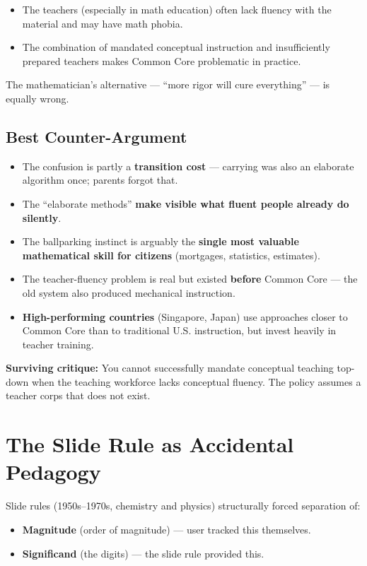 \documentclass[11pt]{article}
\begin{document}
\begin{itemize}
  \item The teachers (especially in math education) often lack fluency with the material and may have math phobia.
  \item The combination of mandated conceptual instruction and insufficiently prepared teachers makes Common Core problematic in practice.
\end{itemize}

The mathematician's alternative --- ``more rigor will cure everything'' --- is equally wrong.

\subsection{Best Counter-Argument}

\begin{itemize}
  \item The confusion is partly a \textbf{transition cost} --- carrying was also an elaborate algorithm once; parents forgot that.
  \item The ``elaborate methods'' \textbf{make visible what fluent people already do silently}.
  \item The ballparking instinct is arguably the \textbf{single most valuable mathematical skill for citizens} (mortgages, statistics, estimates).
  \item The teacher-fluency problem is real but existed \textbf{before} Common Core --- the old system also produced mechanical instruction.
  \item \textbf{High-performing countries} (Singapore, Japan) use approaches closer to Common Core than to traditional U.S. instruction, but invest heavily in teacher training.
\end{itemize}

\textbf{Surviving critique:} You cannot successfully mandate conceptual teaching top-down when the teaching workforce lacks conceptual fluency. The policy assumes a teacher corps that does not exist.

\section{The Slide Rule as Accidental Pedagogy}

Slide rules (1950s--1970s, chemistry and physics) structurally forced separation of:

\begin{itemize}
  \item \textbf{Magnitude} (order of magnitude) --- user tracked this themselves.
  \item \textbf{Significand} (the digits) --- the slide rule provided this.
\end{itemize}
\end{document}
